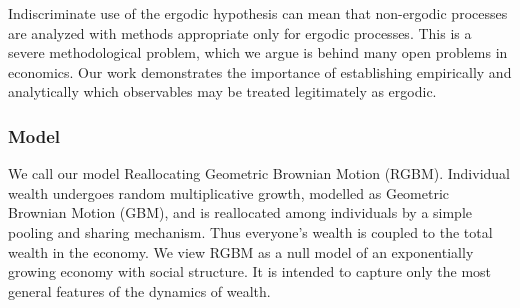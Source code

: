 Indiscriminate use of the ergodic hypothesis can mean that non-ergodic processes are analyzed with methods appropriate only for ergodic processes. This is a severe methodological problem, which we argue is behind many open problems in economics. Our work demonstrates the importance of establishing empirically and analytically which observables may be treated legitimately as ergodic.




\subsubsection{Model}\label{sec:model}

We call our model Reallocating Geometric Brownian Motion (RGBM). Individual wealth undergoes random multiplicative growth, modelled as Geometric Brownian Motion (GBM), and is reallocated among individuals by a simple pooling and sharing mechanism. Thus everyone's wealth is coupled to the total wealth in the economy. We view RGBM as a null model
of an exponentially growing economy with social structure. It is intended to capture only the most general features of the dynamics of wealth.


